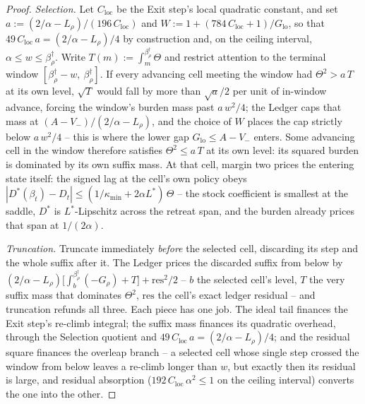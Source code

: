 \documentclass[11pt]{article}
\theoremstyle{definition}
\theoremstyle{remark}
\numberwithin{equation}{section}
\begin{document}
\begin{proof}
\emph{Selection.} Let $C_{\mathrm{loc}}$ be the Exit step's local quadratic constant, and set $a := (2/\alpha - L_\rho)/(196\,C_{\mathrm{loc}})$ and $W := 1 + (784\,C_{\mathrm{loc}} + 1)/G_{\mathrm{lo}}$, so that $49\,C_{\mathrm{loc}}\,a = (2/\alpha - L_\rho)/4$ by construction and, on the ceiling interval, $\alpha \le w \le \beta^\dagger_\rho$. Write $T(m) := \int_m^{\beta^\dagger_\rho}\Theta$ and restrict attention to the terminal window $[\beta^\dagger_\rho - w,\ \beta^\dagger_\rho]$. If every advancing cell meeting the window had $\Theta^2 > a\,T$ at its own level, $\sqrt{T}$ would fall by more than $\sqrt{a}/2$ per unit of in-window advance, forcing the window's burden mass past $a\,w^2/4$; the Ledger caps that mass at $(A - V_-)/(2/\alpha - L_\rho)$, and the choice of $W$ places the cap strictly below $a\,w^2/4$ -- this is where the lower gap $G_{\mathrm{lo}} \le A - V_-$ enters. Some advancing cell in the window therefore satisfies $\Theta^2 \le a\,T$ at its own level: its squared burden is dominated by its own suffix mass. At that cell, margin two prices the entering state itself: the signed lag at the cell's own policy obeys $|D^\ast(\beta_t) - D_t| \le (1/\kappa_{\min} + 2\alpha L^\ast)\,\Theta$ -- the stock coefficient is smallest at the saddle, $D^\ast$ is $L^\ast$-Lipschitz across the retreat span, and the burden already prices that span at $1/(2\alpha)$.

\emph{Truncation.} Truncate immediately \emph{before} the selected cell, discarding its step and the whole suffix after it. The Ledger prices the discarded suffix from below by $(2/\alpha - L_\rho)\bigl[\int_b^{\beta^\dagger_\rho}(-G_\rho) + T\bigr] + \mathrm{res}^2/2$ -- $b$ the selected cell's level, $T$ the very suffix mass that dominates $\Theta^2$, $\mathrm{res}$ the cell's exact ledger residual -- and truncation refunds all three. Each piece has one job. The ideal tail finances the Exit step's re-climb integral; the suffix mass finances its quadratic overhead, through the Selection quotient and $49\,C_{\mathrm{loc}}\,a = (2/\alpha - L_\rho)/4$; and the residual square finances the overleap branch -- a selected cell whose single step crossed the window from below leaves a re-climb longer than $w$, but exactly then its residual is large, and residual absorption ($192\,C_{\mathrm{loc}}\,\alpha^2 \le 1$ on the ceiling interval) converts the one into the other.


\end{proof}
\end{document}

